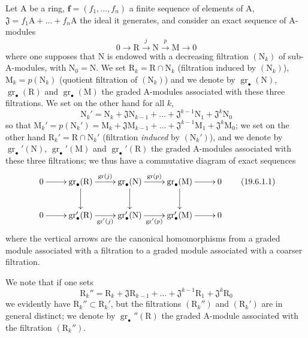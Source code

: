 \begin{env}[19.6.1]
\label{IV.19.6.1}
Let $\mathrm{A}$ be a ring, $\mathbf{f}=(f_1,\ldots,f_n)$ a finite sequence of elements of $\mathrm{A}$, $\mathfrak{J}=f_1\mathrm{A}+\ldots+f_n\mathrm{A}$ the ideal it generates, and consider an exact sequence of $\mathrm{A}$-modules
\[
  0\to\mathrm{R}\xrightarrow{j}\mathrm{N}\xrightarrow{p}\mathrm{M}\to 0
\]
where one supposes that $\mathrm{N}$ is endowed with a decreasing filtration $(\mathrm{N}_k)$ of sub-$\mathrm{A}$-modules, with $\mathrm{N}_0=\mathrm{N}$. We set $\mathrm{R}_k=\mathrm{R}\cap\mathrm{N}_k$ (filtration induced by $(\mathrm{N}_k)$), $\mathrm{M}_k=p(\mathrm{N}_k)$ (quotient filtration of $(\mathrm{N}_k)$) and we denote by $\operatorname{gr}_\bullet(\mathrm{N})$, $\operatorname{gr}_\bullet(\mathrm{R})$ and $\operatorname{gr}_\bullet(\mathrm{M})$ the graded $\mathrm{A}$-modules associated with these three filtrations. We set on the other hand for all $k$,
\[
  \mathrm{N}_k'=\mathrm{N}_k+\mathfrak{J}\mathrm{N}_{k-1}+\ldots+\mathfrak{J}^{k-1}\mathrm{N}_1+\mathfrak{J}^k\mathrm{N}_0
\]
so that $\mathrm{M}_k'=p(\mathrm{N}_k')=\mathrm{M}_k+\mathfrak{J}\mathrm{M}_{k-1}+\ldots+\mathfrak{J}^{k-1}\mathrm{M}_1+\mathfrak{J}^k\mathrm{M}_0$; we set on the other hand $\mathrm{R}_k'=\mathrm{R}\cap\mathrm{N}_k'$ (filtration \emph{induced} by $(\mathrm{N}_k')$), and we denote by $\operatorname{gr}_\bullet'(\mathrm{N})$, $\operatorname{gr}_\bullet'(\mathrm{M})$ and $\operatorname{gr}_\bullet'(\mathrm{R})$ the graded $\mathrm{A}$-modules associated with these three filtrations; we thus have a commutative diagram of exact sequences
\[
\xymatrix{
  0 \ar[r] & \operatorname{gr}_\bullet(\mathrm{R}) \ar[r]^-{\operatorname{gr}(j)} \ar[d] & \operatorname{gr}_\bullet(\mathrm{N}) \ar[r]^-{\operatorname{gr}(p)} \ar[d] & \operatorname{gr}_\bullet(\mathrm{M}) \ar[r] \ar[d] & 0 \\
  0 \ar[r] & \operatorname{gr}_\bullet'(\mathrm{R}) \ar[r]_-{\operatorname{gr}'(j)} & \operatorname{gr}_\bullet'(\mathrm{N}) \ar[r]_-{\operatorname{gr}'(p)} & \operatorname{gr}_\bullet'(\mathrm{M}) \ar[r] & 0
}
\tag{19.6.1.1}
\label{IV.19.6.1.1}
\]
where the vertical arrows are the canonical homomorphisms from a graded module associated with a filtration to a graded module associated with a coarser filtration.

We note that if one sets
\[
  \mathrm{R}_k''=\mathrm{R}_k+\mathfrak{J}\mathrm{R}_{k-1}+\ldots+\mathfrak{J}^{k-1}\mathrm{R}_1+\mathfrak{J}^k\mathrm{R}_0
\]
we evidently have $\mathrm{R}_k''\subset\mathrm{R}_k'$, but the filtrations $(\mathrm{R}_k'')$ and $(\mathrm{R}_k')$ are in general distinct; we denote by $\operatorname{gr}_\bullet''(\mathrm{R})$ the graded $\mathrm{A}$-module associated with the filtration $(\mathrm{R}_k'')$.
\end{env}

